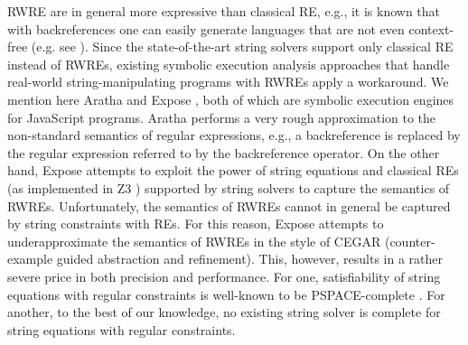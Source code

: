 RWRE are in general more expressive than classical RE, e.g., it is known that
with backreferences one can easily generate languages that are not even 
context-free (e.g. see \cite{FS19}). %
Since the state-of-the-art string solvers support only classical RE instead of
RWREs, %
existing symbolic execution analysis approaches that handle real-world
string-manipulating programs with RWREs apply a workaround.
We mention here Aratha \cite{aratha} and Expose \cite{LMK19}, both of which are
symbolic execution engines for JavaScript programs.
Aratha performs a very rough approximation to the 
non-standard semantics of regular expressions, e.g., a backreference
is replaced by the regular expression referred to by the backreference 
operator. On the other hand, Expose attempts to exploit the power of string 
equations and classical REs (as implemented in Z3 \cite{Z3}) supported by string
solvers to capture the 
semantics of RWREs. Unfortunately, the semantics of RWREs cannot 
in general be captured by string constraints with REs. For this reason, 
Expose attempts to underapproximate the semantics of RWREs in the style of 
CEGAR (counter-example guided abstraction and refinement). This, however,
results in a rather severe price in both precision and performance. For one,
satisfiability of string equations with regular constraints is
well-known to be PSPACE-complete \cite{J16,Kozen77,P04}. For another, to the 
best of our knowledge, no existing string solver is complete for string 
equations with regular
constraints.


